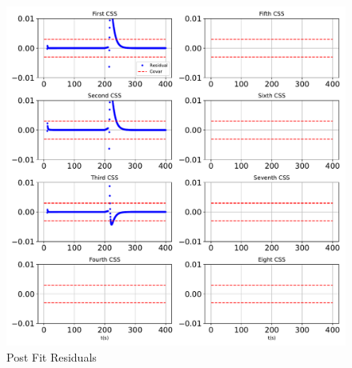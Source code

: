 \begin{figure}[htbp]\centerline{\includegraphics[height=0.9\textwidth, keepaspectratio]{AutoTeX/PostFitupdate}}\caption{Post Fit Residuals}\label{fig:PostFitupdate}\end{figure}